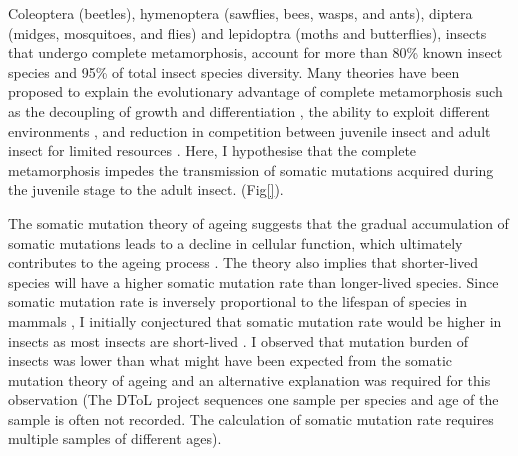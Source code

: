 Coleoptera (beetles), hymenoptera (sawflies, bees, wasps, and ants), diptera (midges, mosquitoes, and flies) and lepidoptra (moths and butterflies), insects that undergo complete metamorphosis, account for more than 80\% known insect species and 95\% of total insect species diversity. Many theories have been proposed to explain the evolutionary advantage of complete metamorphosis such as the decoupling of growth and differentiation \cite{Rolff2019-ef}, the ability to exploit different environments \cite{Darwin1859}, and reduction in competition between juvenile insect and adult insect for limited resources \cite{Ebenman1992-in}. Here, I hypothesise that the complete metamorphosis impedes the transmission of somatic mutations acquired during the juvenile stage to the adult insect. (Fig\ref{}).

The somatic mutation theory of ageing suggests that the gradual accumulation of somatic mutations leads to a decline in cellular function, which ultimately contributes to the ageing process \cite{Szilard1959-ru}. The theory also implies that shorter-lived species will have a higher somatic mutation rate than longer-lived species. Since somatic mutation rate is inversely proportional to the lifespan of species in mammals \cite{Cagan2022-yn}, I initially conjectured that somatic mutation rate would be higher in insects as most insects are short-lived \cite{Promislow2022-en}. I observed that mutation burden of insects was lower than what might have been expected from the somatic mutation theory of ageing and an alternative explanation was required for this observation (The DToL project sequences one sample per species and age of the sample is often not recorded. The calculation of somatic mutation rate requires multiple samples of different ages). 

